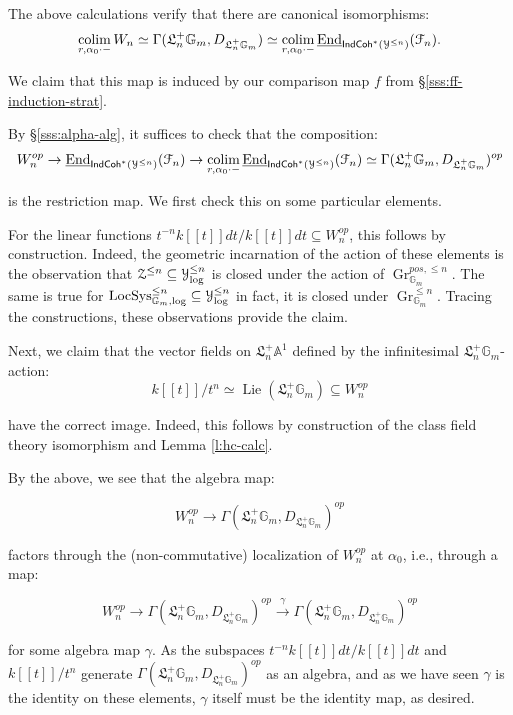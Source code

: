 \documentclass[reqno,11pt]{amsart}
\numberwithin{equation}{subsection}
\theoremstyle{remark}
\newcommand{\xar}[1]{\xrightarrow{#1}}
\newcommand{\bA}{{\mathbb A}}
\newcommand{\bG}{{\mathbb G}}
\newcommand{\sF}{{\EuScript F}}
\newcommand{\sY}{{\EuScript Y}}
\newcommand{\sZ}{{\EuScript Z}}
\newcommand{\fL}{{\mathfrak L}}
\newcommand{\on}{\operatorname}
\newcommand{\ul}{\underline}
\newcommand{\End}{\on{End}}
\newcommand{\Gr}{\on{Gr}}
\newcommand{\LocSys}{\on{LocSys}}
\newcommand{\colim}{\on{colim}}
\newcommand{\IndCoh}{\mathsf{IndCoh}}
\newcommand{\Lie}{\on{Lie}}
\renewcommand{\subset}{\subseteq}
\begin{document}
\subsubsection{}\label{sss:lcft-compat-left}

The above calculations verify that there are canonical isomorphisms:
%
\[
\underset{r,\alpha_0\cdot-}{\colim} \, W_n \simeq 
\Gamma(\fL_n^+ \bG_m,D_{\fL_n^+ \bG_m}) \simeq 
\underset{r,\alpha_0\cdot-}{\colim} \, \ul{\End}_{\IndCoh^*(\sY^{\leq n})}(\sF_n).
\]

We claim that this map is induced by our comparison map $f$ from 
\S \ref{sss:ff-induction-strat}.

By \S \ref{sss:alpha-alg}, it suffices to check that the composition:
%
\[
W_n^{op} \to \ul{\End}_{\IndCoh^*(\sY^{\leq n})}(\sF_n)
\to
\underset{r,\alpha_0\cdot-}{\colim} \, \ul{\End}_{\IndCoh^*(\sY^{\leq n})}(\sF_n)
\simeq \Gamma(\fL_n^+ \bG_m,D_{\fL_n^+ \bG_m})^{op}
\]

\noindent is the restriction map. We first check this on some particular elements.

For the linear functions $t^{-n}k[[t]]dt/k[[t]]dt \subset W_n^{op}$,
this follows by construction. Indeed, the geometric incarnation of the
action of these elements is the observation that 
$\sZ^{\leq n} \subset \sY_{\log}^{\leq n}$ is closed under
the action of $\Gr_{\bG_m}^{pos,\leq n}$. The same is true
for $\LocSys_{\bG_m,\log}^{\leq n} \subset \sY_{\log}^{\leq n}$ \textemdash{}
in fact, it is closed under $\Gr_{\bG_m}^{\leq n}$. Tracing the
constructions, these observations provide the claim.

Next, we claim that the vector fields on $\fL_n^+\bA^1$ defined by the
infinitesimal $\fL_n^+\bG_m$-action: 
%
\[
k[[t]]/t^n \simeq \Lie(\fL_n^+\bG_m) \subset W_n^{op}
\]

\noindent have the correct image. Indeed, this follows by 
construction of the class field theory isomorphism and Lemma \ref{l:hc-calc}.

By the above, we see that the algebra map:

\[
W_n^{op} \to \Gamma(\fL_n^+ \bG_m,D_{\fL_n^+ \bG_m})^{op}
\]

\noindent factors through the (non-commutative) localization of
$W_n^{op}$ at $\alpha_0$, i.e., through a map:

\[
W_n^{op} \to \Gamma(\fL_n^+ \bG_m,D_{\fL_n^+ \bG_m})^{op} \xar{\gamma}
\Gamma(\fL_n^+ \bG_m,D_{\fL_n^+ \bG_m})^{op}
\]

\noindent for some algebra map $\gamma$. As the subspaces
$t^{-n}k[[t]]dt/k[[t]]dt$ and $k[[t]]/t^n$ 
generate $\Gamma(\fL_n^+ \bG_m,D_{\fL_n^+ \bG_m})^{op}$ as an algebra, 
and as we have seen $\gamma$ is the identity on these elements, $\gamma$
itself must be the identity map, as desired.
\end{document}

